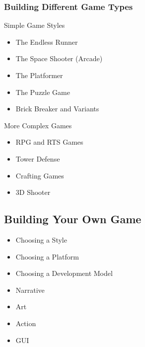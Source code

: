 \documentclass[letterpaper,10pt,english]{sphinxmanual}
\begin{document}
\subsubsection{Building Different Game Types}
\label{gamedev:building-different-game-types}
Simple Game Styles
\begin{itemize}
\item {} 
The Endless Runner

\item {} 
The Space Shooter (Arcade)

\item {} 
The Platformer

\item {} 
The Puzzle Game

\item {} 
Brick Breaker and Variants

\end{itemize}

More Complex Games
\begin{itemize}
\item {} 
RPG and RTS Games

\item {} 
Tower Defense

\item {} 
Crafting Games

\item {} 
3D Shooter

\end{itemize}


\subsection{Building Your Own Game}
\label{gamedev:building-your-own-game}\begin{itemize}
\item {} 
Choosing a Style

\item {} 
Choosing a Platform

\item {} 
Choosing a Development Model

\item {} 
Narrative

\item {} 
Art

\item {} 
Action

\item {} 
GUI

\end{itemize}
\end{document}
